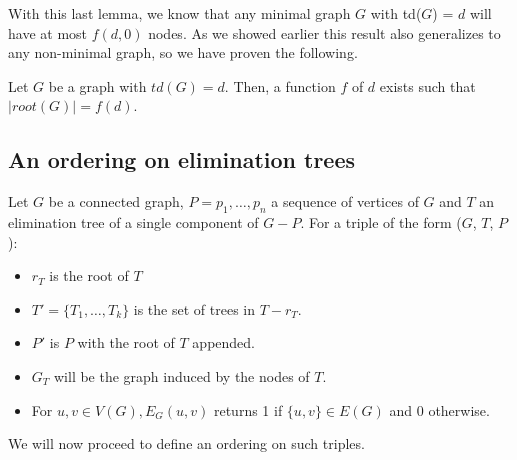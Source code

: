 With this last lemma, we know that any minimal graph $G$ with td($G$) = $d$ will have at most $f(d, 0)$ nodes. As we showed earlier this result also generalizes to any non-minimal graph, so we have proven the following.

\begin{theorem}
Let $G$ be a graph with $td(G) = d$. Then, a function $f$ of $d$ exists such that $|root(G)| = f(d)$.
\end{theorem}

\subsection{An ordering on elimination trees}
\begin{definition}
Let $G$ be a connected graph, $P = p_1,\ldots, p_n$ a sequence of vertices of $G$ and $T$ an elimination tree of a single component of $G-P$. For a triple of the form ($G$, $T$, $P$):
  
\begin{itemize}
 \item $r_T$ is the root of $T$
 \item $T' = \{T_1, \ldots, T_k\}$ is the set of trees in $T-r_T$.
 \item $P'$ is $P$ with the root of $T$ appended.
 \item $G_T$ will be the graph induced by the nodes of $T$.
 \item For $u,v \in V(G), E_G(u, v)$ returns 1 if $\{u, v\} \in E(G)$ and 0 otherwise.
 \end{itemize}
\end{definition}

We will now proceed to define an ordering on such triples.
 
